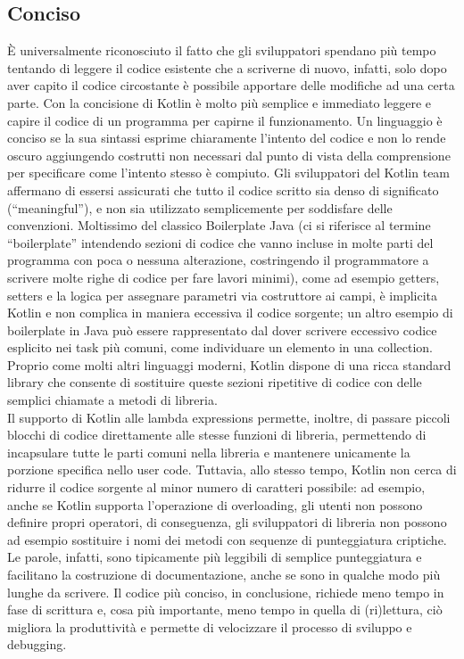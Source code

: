 \subsection{Conciso}
È universalmente riconosciuto il fatto che gli sviluppatori spendano più tempo tentando di leggere il codice esistente che a scriverne di nuovo, infatti, solo dopo aver capito il codice circostante è possibile apportare delle modifiche ad una certa parte. Con la concisione di Kotlin è molto più semplice e immediato leggere e capire il codice di un programma per capirne il funzionamento. Un linguaggio è conciso se la sua sintassi esprime chiaramente l'intento del codice e non lo rende oscuro aggiungendo costrutti non necessari dal punto di vista della comprensione per specificare come l'intento stesso è compiuto. Gli sviluppatori del Kotlin team affermano di essersi assicurati che tutto il codice scritto sia denso di significato (“meaningful”), e non sia utilizzato semplicemente per soddisfare delle convenzioni.
Moltissimo del classico Boilerplate Java (ci si riferisce al termine “boilerplate” intendendo sezioni di codice che vanno incluse in molte parti del programma con poca o nessuna alterazione, costringendo il programmatore a scrivere molte righe di codice per fare lavori minimi), come ad esempio getters, setters e la logica per assegnare parametri via costruttore ai campi, è implicita Kotlin e non complica in maniera eccessiva il codice sorgente; un altro esempio di boilerplate in Java può essere rappresentato dal dover scrivere eccessivo codice esplicito nei task più comuni, come individuare un elemento in una collection. Proprio come molti altri linguaggi moderni, Kotlin dispone di una ricca standard library che consente di sostituire queste sezioni ripetitive di codice con delle semplici chiamate a metodi di libreria.\\
Il supporto di Kotlin alle lambda expressions permette, inoltre, di passare piccoli blocchi di codice direttamente alle stesse funzioni di libreria, permettendo di incapsulare tutte le parti comuni nella libreria e mantenere unicamente la porzione specifica nello user code. Tuttavia, allo stesso tempo, Kotlin non cerca di ridurre il codice sorgente al minor numero di caratteri possibile: ad esempio, anche se Kotlin supporta l'operazione di overloading, gli utenti non possono definire propri operatori, di conseguenza, gli sviluppatori di libreria non possono ad esempio sostituire i nomi dei metodi con sequenze di punteggiatura criptiche. Le parole, infatti, sono tipicamente più leggibili di semplice punteggiatura e facilitano la costruzione di documentazione, anche se sono in qualche modo più lunghe da scrivere. Il codice più conciso, in conclusione, richiede meno tempo in fase di scrittura e, cosa più importante, meno tempo in quella di (ri)lettura, ciò migliora la produttività e permette di velocizzare il processo di sviluppo e debugging.\\

